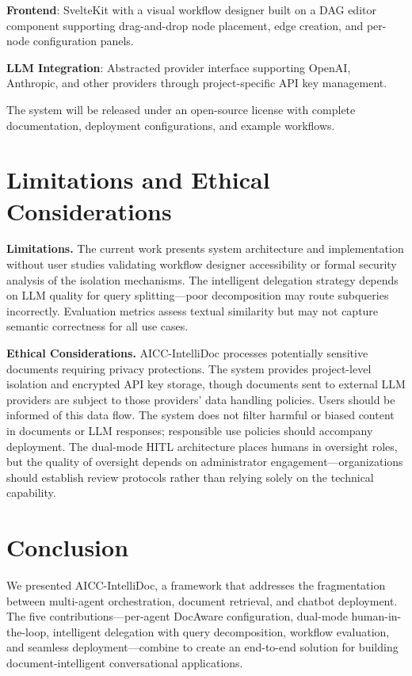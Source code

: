 \documentclass[11pt]{article}
\begin{document}
\textbf{Frontend}: SvelteKit with a visual workflow designer built on a DAG editor component supporting drag-and-drop node placement, edge creation, and per-node configuration panels.

\textbf{LLM Integration}: Abstracted provider interface supporting OpenAI, Anthropic, and other providers through project-specific API key management.

The system will be released under an open-source license with complete documentation, deployment configurations, and example workflows.


\section{Limitations and Ethical Considerations}
\label{sec:limitations}

\textbf{Limitations.} The current work presents system architecture and implementation without user studies validating workflow designer accessibility or formal security analysis of the isolation mechanisms. The intelligent delegation strategy depends on LLM quality for query splitting—poor decomposition may route subqueries incorrectly. Evaluation metrics assess textual similarity but may not capture semantic correctness for all use cases.

\textbf{Ethical Considerations.} AICC-IntelliDoc processes potentially sensitive documents requiring privacy protections. The system provides project-level isolation and encrypted API key storage, though documents sent to external LLM providers are subject to those providers' data handling policies. Users should be informed of this data flow. The system does not filter harmful or biased content in documents or LLM responses; responsible use policies should accompany deployment. The dual-mode HITL architecture places humans in oversight roles, but the quality of oversight depends on administrator engagement—organizations should establish review protocols rather than relying solely on the technical capability.


\section{Conclusion}
\label{sec:conclusion}

We presented AICC-IntelliDoc, a framework that addresses the fragmentation between multi-agent orchestration, document retrieval, and chatbot deployment. The five contributions—per-agent DocAware configuration, dual-mode human-in-the-loop, intelligent delegation with query decomposition, workflow evaluation, and seamless deployment—combine to create an end-to-end solution for building document-intelligent conversational applications.
\end{document}
